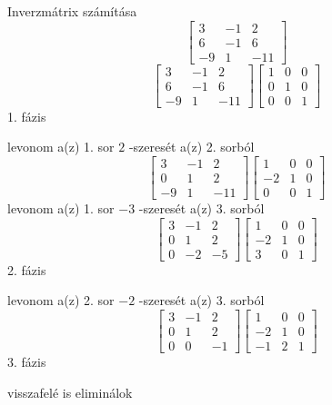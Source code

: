 \documentclass[12pt]{article}
\begin{document}
Inverzmátrix számítása
$$\left[{\begin{array}{ccc}3& -1& 2\\ 6& -1& 6\\ -9& 1& -11\end{array}}\right]$$
$$\left[{\begin{array}{ccc}3& -1& 2\\ 6& -1& 6\\ -9& 1& -11\end{array}}\right]\left[{\begin{array}{ccc}1& 0& 0\\ 0& 1& 0\\ 0& 0& 1\end{array}}\right]$$
1. fázis

levonom a(z) 1. sor $2$ -szeresét a(z) 2. sorból
$$\left[{\begin{array}{ccc}3& -1& 2\\ 0& 1& 2\\ -9& 1& -11\end{array}}\right]\left[{\begin{array}{ccc}1& 0& 0\\ -2& 1& 0\\ 0& 0& 1\end{array}}\right]$$
levonom a(z) 1. sor $-3$ -szeresét a(z) 3. sorból
$$\left[{\begin{array}{ccc}3& -1& 2\\ 0& 1& 2\\ 0& -2& -5\end{array}}\right]\left[{\begin{array}{ccc}1& 0& 0\\ -2& 1& 0\\ 3& 0& 1\end{array}}\right]$$
2. fázis

levonom a(z) 2. sor $-2$ -szeresét a(z) 3. sorból
$$\left[{\begin{array}{ccc}3& -1& 2\\ 0& 1& 2\\ 0& 0& -1\end{array}}\right]\left[{\begin{array}{ccc}1& 0& 0\\ -2& 1& 0\\ -1& 2& 1\end{array}}\right]$$
3. fázis

visszafelé is eliminálok
\end{document}

